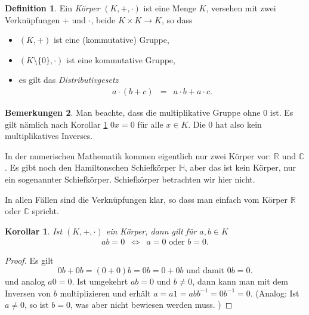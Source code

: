 \documentclass[index=totoc]{scrartcl}%
\newtheorem{cor}[thm]{Korollar}
\theoremstyle{definition}
\newtheorem{defi}{Definition}[section]
\newtheorem{bemn}[defi]{Bemerkungen}
\newcommand{\R}{\mathbb R}
\newcommand{\C}{\mathbb C}
\newcommand{\Hd}{\mathbb H}
\begin{document}
\begin{defi}
  Ein {\em Körper} $(K, +, \cdot)$ ist eine Menge $K$,
  versehen mit zwei Verknüpfungen $+$ und $\cdot$, beide $K\times K\to K$,
  so dass
  \begin{itemize}
  \item
    $(K,+)$ ist eine (kommutative) Gruppe, 
  \item
    $(K\setminus\{0\},\cdot)$ ist eine kommutative Gruppe,
  \item
    es gilt das {\em Distributivgesetz}
    \begin{eqnarray*}
      a\cdot(b+c) &=& a\cdot b+a\cdot c. 
    \end{eqnarray*}
  \end{itemize}
\end{defi}

\begin{bemn}
  Man beachte, dass die multiplikative Gruppe ohne $0$ ist.
  Es gilt nämlich nach Korollar \ref{cor:factor0K} $0x=0$ für alle $x\in K$. 
  Die $0$ hat also kein multiplikatives Inverses.
  
  In der numerischen Mathematik kommen eigentlich nur zwei Körper vor:
  $\R$ und $\C$.
  Es gibt noch den Hamiltonschen Schiefkörper $\Hd$,
  aber das ist kein Körper, nur ein sogenannter Schiefkörper.
  Schiefkörper betrachten wir hier nicht.

  In allen Fällen sind die Verknüpfungen klar,
  so dass man einfach vom Körper $\R$ oder $\C$ spricht.
\end{bemn}

\begin{cor}\label{cor:factor0K}
  Ist $(K, +, \cdot)$ ein Körper, dann gilt für $a,b\in K$
  \begin{eqnarray*}
    ab=0 & \iff & a=0\text{ oder }b=0. 
  \end{eqnarray*}
\end{cor}

\begin{proof}
  Es gilt
  \begin{equation*}
    0b+0b=(0+0)b=0b=0+0b\text{ und damit }0b=0.
  \end{equation*}
  und analog $a0=0$.
  Ist umgekehrt $ab=0$ und $b\not=0$,
  dann kann man mit dem Inversen von $b$ multiplizieren
  und erhält $a=a1=abb^{-1}=0b^{-1}=0$.
  (Analog: Ist $a\not=0$, so ist $b=0$, was aber nicht bewiesen werden muss. )
\end{proof}
\end{document}

